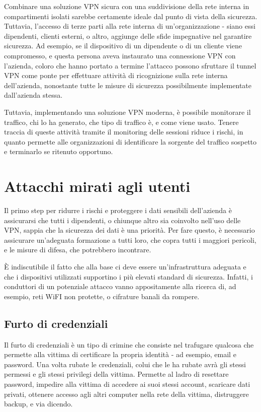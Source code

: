 Combinare una soluzione VPN sicura con una suddivisione della rete interna in compartimenti isolati sarebbe certamente ideale dal punto di vista della sicurezza.
Tuttavia, l'accesso di terze parti alla rete interna di un'organizzazione - siano essi dipendenti, clienti esterni, o altro, aggiunge delle sfide impegnative nel garantire sicurezza.
Ad esempio, se il dispositivo di un dipendente o di un cliente viene compromesso, e questa persona aveva instaurato una connessione VPN con l'azienda, coloro che hanno portato a termine l'attacco possono sfruttare il tunnel VPN come ponte per effettuare attività di ricognizione sulla rete interna dell'azienda, nonostante tutte le misure di sicurezza possibilmente implementate dall'azienda stessa.

Tuttavia, implementando una soluzione VPN moderna, è possibile monitorare il traffico, chi lo ha generato, che tipo di traffico è, e come viene usato. Tenere traccia di queste attività tramite il monitoring delle sessioni riduce i rischi, in quanto permette alle organizzazioni di identificare la sorgente del traffico sospetto e terminarlo se ritenuto opportuno.

\section{Attacchi mirati agli utenti}

Il primo step per ridurre i rischi e proteggere i dati sensibili dell'azienda è assicurarsi che tutti i dipendenti, o chiunque altro sia coinvolto nell'uso delle VPN, sappia che la sicurezza dei dati è una priorità.
Per fare questo, è necessario assicurare un'adeguata formazione a tutti loro, che copra tutti i maggiori pericoli, e le misure di difesa, che potrebbero incontrare.

È indiscutibile il fatto che alla base ci deve essere un'infrastruttura adeguata e che i dispositivi utilizzati supportino i più elevati standard di sicurezza. Infatti, i conduttori di un potenziale attacco vanno appositamente alla ricerca di, ad esempio, reti WiFI non protette, o cifrature banali da rompere.

\subsection{Furto di credenziali}
Il furto di credenziali è un tipo di crimine che consiste nel trafugare qualcosa che permette alla vittima di certificare la propria identità - ad esempio, email e password.
Una volta rubate le credenziali, colui che le ha rubate avrà gli stessi permessi e gli stessi privilegi della vittima.
Permette al ladro di resettare password, impedire alla vittima di accedere ai suoi stessi account, scaricare dati privati, ottenere accesso agli altri computer nella rete della vittima, distruggere backup, e via dicendo.

